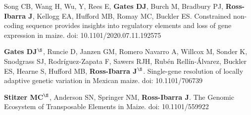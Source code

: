 \documentclass[letterpaper,10pt]{article}
\renewenvironment{itemize}{
  \begin{list}{}{
    \setlength{\leftmargin}{1.5em}
  }
}{
  \end{list}
}
\begin{document}
\begin{itemize}
\item Song CB, Wang H, Wu, Y, Rees E, \textbf{Gates DJ}, Burch M,  Bradbury PJ, \textbf{Ross-Ibarra J}, Kellogg EA, Hufford MB, Romay MC, Buckler ES.  Constrained non-coding sequence provides insights into regulatory elements and loss of gene expression in maize. doi: 10.1101/2020.07.11.192575

\item \textbf{Gates DJ}$^\S$, Runcie D, Janzen GM, Romero Navarro A,  Willcox M,  Sonder K, Snodgrass SJ, Rodr\'{i}guez-Zapata F,  Sawers RJH, Rub\'{e}n Rell\'{i}n-\'{A}lvarez, Buckler ES, Hearne S, Hufford MB, \textbf{Ross-Ibarra J}$^\S$. Single-gene resolution of locally adaptive genetic variation in Mexican maize. doi: 10.1101/706739

\item \textbf{Stitzer MC}$^\S$, Anderson SN, Springer NM, \textbf{Ross-Ibarra J}. The Genomic Ecosystem of Transposable Elements in Maize. doi: 10.1101/559922

\end{itemize}


\end{document}
